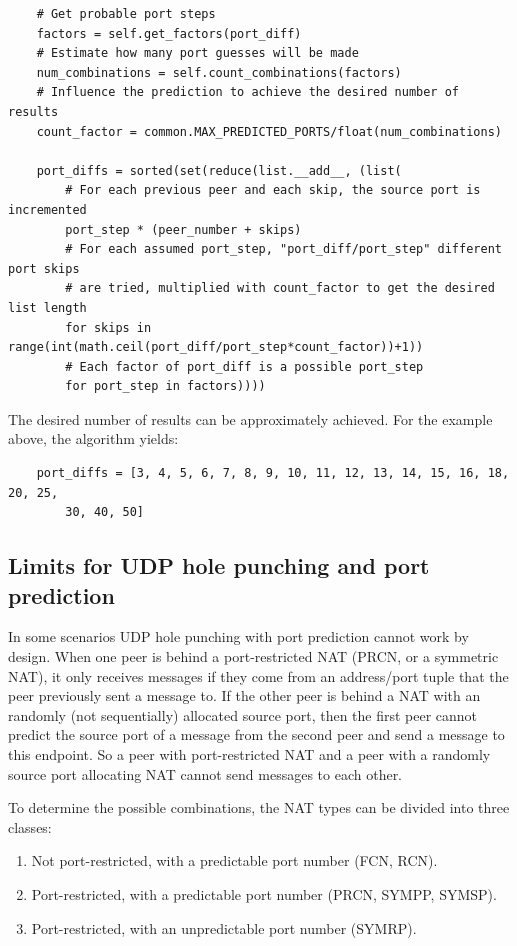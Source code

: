 \documentclass{article}
\begin{document}
\begin{verbatim}
    # Get probable port steps
    factors = self.get_factors(port_diff)
    # Estimate how many port guesses will be made
    num_combinations = self.count_combinations(factors)
    # Influence the prediction to achieve the desired number of results
    count_factor = common.MAX_PREDICTED_PORTS/float(num_combinations)

    port_diffs = sorted(set(reduce(list.__add__, (list(
        # For each previous peer and each skip, the source port is incremented
        port_step * (peer_number + skips)
        # For each assumed port_step, "port_diff/port_step" different port skips
        # are tried, multiplied with count_factor to get the desired list length
        for skips in range(int(math.ceil(port_diff/port_step*count_factor))+1))
        # Each factor of port_diff is a possible port_step
        for port_step in factors))))
\end{verbatim}

The desired number of results can be approximately achieved. For the
example above, the algorithm yields:

\begin{verbatim}
    port_diffs = [3, 4, 5, 6, 7, 8, 9, 10, 11, 12, 13, 14, 15, 16, 18, 20, 25,
        30, 40, 50]
\end{verbatim}

\subsection{Limits for UDP hole punching and port prediction}

In some scenarios UDP hole punching with port prediction cannot work
by design.  When one peer is behind a port-restricted NAT (PRCN, or a
symmetric NAT), it only receives messages if they come from an
address/port tuple that the peer previously sent a message to. If the
other peer is behind a NAT with an randomly (not sequentially)
allocated source port, then the first peer cannot predict the source
port of a message from the second peer and send a message to this
endpoint. So a peer with port-restricted NAT and a peer with a
randomly source port allocating NAT cannot send messages to each
other.

To determine the possible combinations, the NAT types can be divided
into three classes:

\begin{enumerate}

\item Not port-restricted, with a predictable port number (FCN, RCN).

\item Port-restricted, with a predictable port number (PRCN, SYMPP,
   SYMSP).

\item Port-restricted, with an unpredictable port number (SYMRP).

\end{enumerate}
\end{document}
